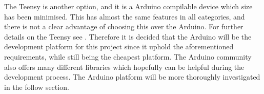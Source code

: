 The Teensy is another option, and it is a Arduino compilable device which size has been minimised.
This has almost the same features in all categories, and there is not a clear advantage of choosing this over the Arduino.
For further details on the Teensy see \cite{TeensyIsDopeMan}.  
Therefore it is decided that the Arduino will be the development platform for this project since it uphold the aforementioned requirements, while still being the cheapest platform.
The Arduino community also offers many different libraries which hopefully can be helpful during the development process.
The Arduino platform will be more thoroughly investigated in the follow section.
